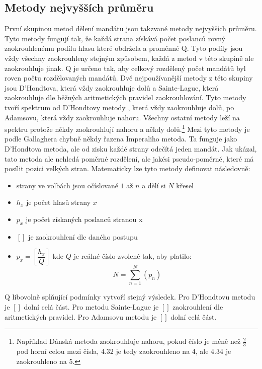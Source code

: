 \documentclass[12pt]{report}
\begin{document}
\subsection{Metody nejvyšších průměru} První skupinou metod dělení mandátu jsou takzvané metody nejvyšších průměru.
Tyto metody fungují tak, že každá strana získává počet poslanců rovný zaokrouhlenému podílu hlasu které obdržela a proměnné Q.
Tyto podíly jsou vždy všechny zaokrouhleny stejným způsobem, každá z metod v této skupině ale zaokrouhluje jinak.
Q je určeno tak, aby celkový rozdělený počet mandátů byl roven počtu rozdělovaných mandátů.
Dvě nejpoužívanější metody z této skupiny jsou D'Hondtova, která vždy zaokrouhluje dolů a Sainte-Lague, která zaokrouhluje dle běžných aritmetických pravidel zaokrouhlování.
Tyto metody tvoří spektrum od D'Hondtovy metody , která vždy zaokrouhluje dolů, po Adamsovu, která vždy zaokrouhluje nahoru.
Všechny ostatní metody leží na spektru protože někdy zaokrouhlují nahoru a někdy dolů.\footnote{Například Dánská metoda zaokrouhluje nahoru, pokud číslo je méně než $\frac{2}{3}$ pod horní celou mezi čísla, 4.32 je tedy zaokrouhleno na 4, ale 4.34 je zaokrouhleno na 5.} Mezi tyto metody je podle Gallaghera chybně někdy řazena Imperaliho metoda.
Ta funguje jako D'Hondtova metoda, ale od zisku každé strany odečítá jeden mandát.
Jak ukázal, tato metoda ale nehledá poměrné rozdělení, ale jakési pseudo-poměrné, které má posílit pozici velkých stran.\autocite{GAL1}
\newpage
Matematicky lze tyto metody definovat následovně: 
\begin{itemize}
\item strany ve volbách jsou očíslované $1$ až $n$ a dělí si $N$ křesel
\item $h_{x}$ je počet hlasů strany $x$ \item $p_{x}$ je počet získaných poslanců stranou x
\item $[ ]$ je zaokrouhlení dle daného postupu
\item $p_{x}=[\dfrac{h_{x}}{Q}]$ kde $Q$ je reálné číslo zvolené tak, aby platilo: $$N=\sum_{n=1}^{N} (p_{n})$$
\end{itemize}
Q libovolně splňující podmínky vytvoří stejný výsledek.\autocite{GAL1}
Pro D'Hondtovu metodu je $[ ]$ dolní celá část.
Pro metodu Sainte-Lague je $[ ]$ zaokrouhlení dle aritmetických pravidel.
Pro Adamsovu metodu je $[ ]$ dolní celá část.
\end{document}
